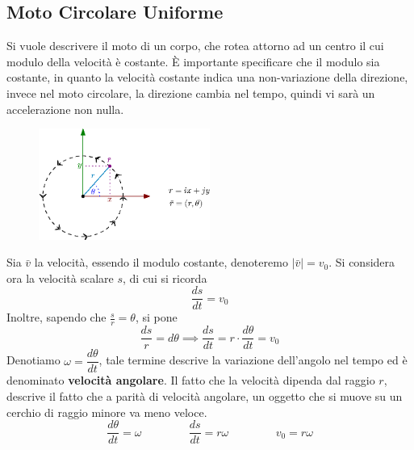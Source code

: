 \documentclass[10pt, letterpaper]{report}
\begin{document}
\subsection{Moto Circolare Uniforme}
Si vuole descrivere il moto di un corpo, che rotea attorno ad un centro il cui modulo della 
velocità è costante. È importante specificare che il modulo sia costante, in quanto la velocità 
costante indica una non-variazione della direzione, invece nel moto circolare, la direzione 
cambia nel tempo, quindi vi sarà un accelerazione non nulla.\begin{center}
    \begin{figure}[h!]
        \centering
        \includegraphics[width=0.5\textwidth]{images/motoCircUn.eps}
    \end{figure} 
\end{center}
Sia $\bar v$ la velocità, essendo il modulo costante, denoteremo $|\bar v|=v_0$. Si considera ora 
la velocità scalare $s$, di cui si ricorda 
$$ \frac{ds}{dt}=v_0$$
Inoltre, sapendo che $\frac{s}{r}=\theta$, si pone 
$$ \frac{ds}{r}=d\theta \implies \frac{ds}{dt}=r\cdot \frac{d\theta}{dt}=v_0$$
Denotiamo $\omega = \dfrac{d\theta}{dt}$, tale termine descrive la variazione dell'angolo nel tempo 
ed è denominato \textbf{velocità angolare}. Il fatto che la velocità dipenda dal raggio $r$, descrive il fatto 
che a parità di velocità angolare, un oggetto che si muove su un cerchio di raggio minore va meno veloce. 
$$ \frac{d\theta}{dt}=\omega \;\;\;\;\;\;\;\;\;\;\;\;\;\;\;
\frac{ds}{dt}=r\omega \;\;\;\;\; \;\;\;\;\;\;\;\;\;\;
v_0=r\omega$$
\end{document}
